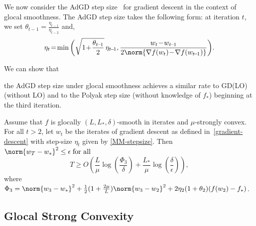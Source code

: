\documentclass[10pt]{article} %
\newif\ifextended
\begin{document}
We now consider the AdGD step size~\cite{MalitskyM20} for gradient descent in the context of glocal smoothness. The AdGD step size takes the following form: at iteration $t$, we set $\theta_{t-1} = \frac{\eta_{t-1}}{\eta_{t-2}}$ and,
\begin{equation}
    \label{MM-stepsize}
     \eta_t \!=\! \min \bigg( \sqrt{1 \!+\! \frac{\theta_{t\!-\!1}}{2}} \, \eta_{t\!-\!1}, \frac{w_t \!-\! w_{t\!-\!1}}{2 \norm{\nabla f(w_t)\! -\! \nabla f(w_{t\!-\!1})}} \bigg).
\end{equation} 
\ifextended
In Appendix \ref{MM-proof}, we show that
\else
We can show that
\fi
the AdGD step size under glocal smoothness achieves a similar rate to GD(LO) (without LO) and to the Polyak step size (without knowledge of $f_*$) beginning at the third iteration.
\begin{theorem}
    \label{MM-theorem}
    Assume that $f$ is glocally $(L, L_*, \delta)$-smooth in iterates and $\mu$-strongly convex. For all $t > 2$, let $w_t$ be the iterates of gradient descent as defined in~\eqref{gradient-descent} with step-size $\eta_t$ given by \eqref{MM-stepsize}. Then $\norm{w_T - w_*}^2 \leq \epsilon \;\text{for all}$
    \begin{equation*}        
         T \geq 
         O\left(\frac{L}{\mu}\log\left(\frac{\Phi_3}{\delta}\right) + \frac{L_*}{\mu}\log\left(\frac{\delta}{\epsilon}\right)\right),
    \end{equation*}
    where $\Phi_3 = \norm{w_3 - w_*}^2 + \frac{1}{2}(1 + \frac{2\mu}{L})\norm{w_{3} - w_{2}}^2 + 2\eta_{2}(1 + \theta_{2})(f(w_{2}) - f_*)$.
\end{theorem}


\subsection{Glocal Strong Convexity}
\label{glocal-strong-convex-section}
\end{document}
